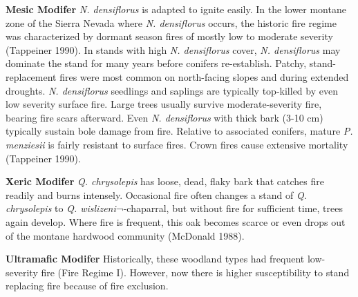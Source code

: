 \begin{adjustwidth}{2cm}{}
\textbf{Mesic Modifer }
\emph{N. densiflorus} is adapted to ignite easily. In the lower montane zone of the Sierra Nevada where \emph{N. densiflorus} occurs, the historic fire regime was characterized by dormant season fires of mostly low to moderate severity (Tappeiner 1990). In stands with high \emph{N. densiflorus} cover, \emph{N. densiflorus} may dominate the stand for many years before conifers re-establish. Patchy, stand-replacement fires were most common on north-facing slopes and during extended droughts. \emph{N. densiflorus} seedlings and saplings are typically top-killed by even low severity surface fire. Large trees usually survive moderate-severity fire, bearing fire scars afterward. Even \emph{N. densiflorus} with thick bark (3-10 cm) typically sustain bole damage from fire. Relative to associated conifers, mature \emph{P. menziesii} is fairly resistant to surface fires. Crown fires cause extensive mortality (Tappeiner 1990).

\medskip
\noindent \textbf{Xeric Modifer} \emph{Q. chrysolepis} has loose, dead, flaky bark that catches fire readily and burns intensely. Occasional fire often changes a stand of \emph{Q. chrysolepis} to \emph{Q. wislizeni}¬-chaparral, but without fire for sufficient time, trees again develop. Where fire is frequent, this oak becomes scarce or even drops out of the montane hardwood community (McDonald 1988).

\medskip
\noindent \textbf{Ultramafic Modifer} Historically, these woodland types had frequent low-severity fire (Fire Regime I). However, now there is higher susceptibility to stand replacing fire because of fire exclusion.

\end{adjustwidth}



